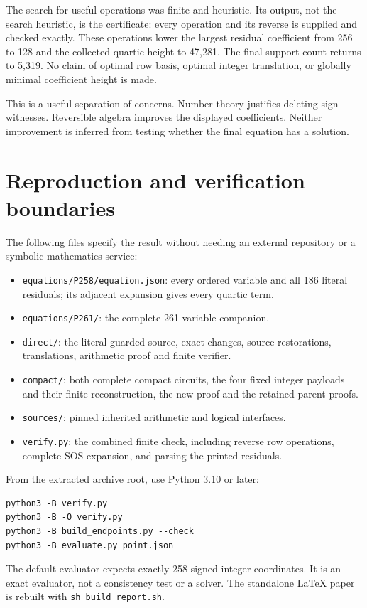 \documentclass[11pt]{article}
\newcommand{\code}[1]{\texttt{\small #1}}
\begin{document}
The search for useful operations was finite and heuristic. Its output,
not the search heuristic, is the certificate: every operation and its
reverse is supplied and checked exactly. These operations lower the
largest residual coefficient from 256 to 128 and the collected quartic
height to 47,281. The final support count returns to 5,319. No claim of
optimal row basis, optimal integer translation, or globally minimal
coefficient height is made.

This is a useful separation of concerns. Number theory justifies deleting
sign witnesses. Reversible algebra improves the displayed coefficients.
Neither improvement is inferred from testing whether the final equation
has a solution.



\section{Reproduction and verification boundaries}

The following files specify the result without needing an external
repository or a symbolic-mathematics service:
\begin{itemize}
\item \code{equations/P258/equation.json}: every ordered variable and all
186 literal residuals; its adjacent expansion gives every quartic term.
\item \code{equations/P261/}: the complete 261-variable companion.
\item \code{direct/}: the literal guarded source, exact changes, source
restorations, translations, arithmetic proof and finite verifier.
\item \code{compact/}: both complete compact circuits, the four fixed
integer payloads and their finite reconstruction, the new proof and
the retained parent proofs.
\item \code{sources/}: pinned inherited arithmetic and logical interfaces.
\item \code{verify.py}: the combined finite check, including reverse row
operations, complete SOS expansion, and parsing the printed residuals.
\end{itemize}

From the extracted archive root, use Python 3.10 or later:
\begin{verbatim}
python3 -B verify.py
python3 -B -O verify.py
python3 -B build_endpoints.py --check
python3 -B evaluate.py point.json
\end{verbatim}
The default evaluator expects exactly 258 signed integer coordinates.
It is an exact evaluator, not a consistency test or a solver. The
standalone LaTeX paper is rebuilt with \code{sh build\_report.sh}.
\end{document}

